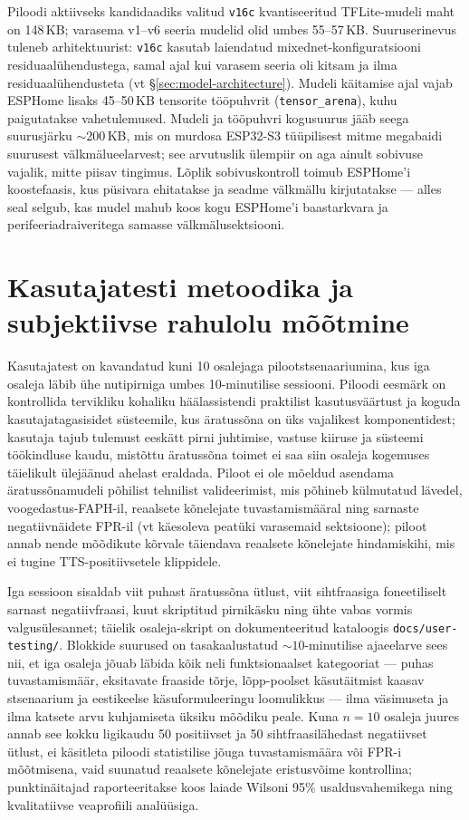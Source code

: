 Piloodi aktiivseks kandidaadiks valitud \texttt{v16c} kvantiseeritud TFLite-mudeli maht on 148\,KB; varasema v1--v6 seeria mudelid olid umbes 55--57\,KB. Suuruserinevus tuleneb arhitektuurist: \texttt{v16c} kasutab laiendatud mixednet-konfiguratsiooni residuaalühendustega, samal ajal kui varasem seeria oli kitsam ja ilma residuaalühendusteta (vt §\ref{sec:model-architecture}). Mudeli käitamise ajal vajab ESPHome lisaks 45--50\,KB tensorite tööpuhvrit (\texttt{tensor\_arena}), kuhu paigutatakse vahetulemused. Mudeli ja tööpuhvri kogusuurus jääb seega suurusjärku ${\sim}200$\,KB, mis on murdosa ESP32-S3 tüüpilisest mitme megabaidi suurusest välkmälueelarvest; see arvutuslik ülempiir on aga ainult sobivuse vajalik, mitte piisav tingimus. Lõplik sobivuskontroll toimub ESPHome'i koostefaasis, kus püsivara ehitatakse ja seadme välkmällu kirjutatakse --- alles seal selgub, kas mudel mahub koos kogu ESPHome'i baastarkvara ja perifeeriadraiveritega samasse välkmälusektsiooni.

\section{Kasutajatesti metoodika ja subjektiivse rahulolu mõõtmine}
\label{sec:user-test-methodology}
Kasutajatest on kavandatud kuni 10 osalejaga pilootstsenaariumina, kus iga osaleja läbib ühe nutipirniga umbes 10-minutilise sessiooni. Piloodi eesmärk on kontrollida tervikliku kohaliku häälassistendi praktilist kasutusväärtust ja koguda kasutajatagasisidet süsteemile, kus äratussõna on üks vajalikest komponentidest; kasutaja tajub tulemust eeskätt pirni juhtimise, vastuse kiiruse ja süsteemi töökindluse kaudu, mistõttu äratussõna toimet ei saa siin osaleja kogemuses täielikult ülejäänud ahelast eraldada. Piloot ei ole mõeldud asendama äratussõnamudeli põhilist tehnilist valideerimist, mis põhineb külmutatud lävedel, voogedastus-FAPH-il, reaalsete kõnelejate tuvastamismääral ning sarnaste negatiivnäidete FPR-il (vt käesoleva peatüki varasemaid sektsioone); piloot annab nende mõõdikute kõrvale täiendava reaalsete kõnelejate hindamiskihi, mis ei tugine TTS-positiivsetele klippidele.

Iga sessioon sisaldab viit puhast äratussõna ütlust, viit sihtfraasiga foneetiliselt sarnast negatiivfraasi, kuut skriptitud pirnikäsku ning ühte vabas vormis valgusülesannet; täielik osaleja-skript on dokumenteeritud kataloogis \texttt{docs/user-testing/}. Blokkide suurused on tasakaalustatud ${\sim}10$-minutilise ajaeelarve sees nii, et iga osaleja jõuab läbida kõik neli funktsionaalset kategooriat --- puhas tuvastamismäär, eksitavate fraaside tõrje, lõpp-poolset käsutäitmist kaasav stsenaarium ja eestikeelse käsuformuleeringu loomulikkus --- ilma väsimuseta ja ilma katsete arvu kuhjamiseta üksiku mõõdiku peale. Kuna $n=10$ osaleja juures annab see kokku ligikaudu 50 positiivset ja 50 sihtfraasilähedast negatiivset ütlust, ei käsitleta piloodi statistilise jõuga tuvastamismäära või FPR-i mõõtmisena, vaid suunatud reaalsete kõnelejate eristusvõime kontrollina; punktinäitajad raporteeritakse koos laiade Wilsoni 95\% usaldusvahemikega ning kvalitatiivse veaprofiili analüüsiga.

